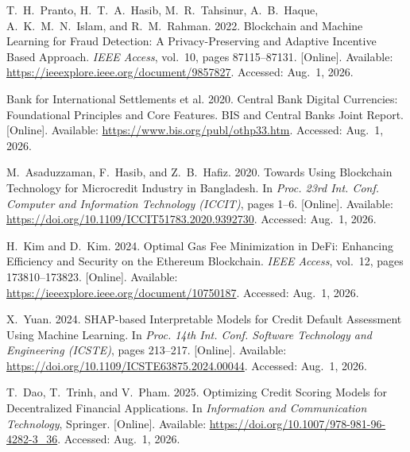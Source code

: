 \documentclass[12pt,a4paper]{report}
\begin{document}
{\begin{enumerate}[label={[\arabic*]}]
\item T.~H.~Pranto, H.~T.~A.~Hasib, M.~R.~Tahsinur, A.~B.~Haque, A.~K.~M.~N.~Islam, and R.~M.~Rahman. 2022. Blockchain and Machine Learning for Fraud Detection: A Privacy-Preserving and Adaptive Incentive Based Approach. \emph{IEEE Access}, vol.~10, pages 87115--87131. [Online]. Available: \url{https://ieeexplore.ieee.org/document/9857827}. Accessed: Aug.~1, 2026.

\item Bank for International Settlements et al. 2020. Central Bank Digital Currencies: Foundational Principles and Core Features. BIS and Central Banks Joint Report. [Online]. Available: \url{https://www.bis.org/publ/othp33.htm}. Accessed: Aug.~1, 2026.

\item M.~Asaduzzaman, F.~Hasib, and Z.~B.~Hafiz. 2020. Towards Using Blockchain Technology for Microcredit Industry in Bangladesh. In \emph{Proc. 23rd Int. Conf. Computer and Information Technology (ICCIT)}, pages 1--6. [Online]. Available: \url{https://doi.org/10.1109/ICCIT51783.2020.9392730}. Accessed: Aug.~1, 2026.

\item H.~Kim and D.~Kim. 2024. Optimal Gas Fee Minimization in DeFi: Enhancing Efficiency and Security on the Ethereum Blockchain. \emph{IEEE Access}, vol.~12, pages 173810--173823. [Online]. Available: \url{https://ieeexplore.ieee.org/document/10750187}. Accessed: Aug.~1, 2026.

\item X.~Yuan. 2024. SHAP-based Interpretable Models for Credit Default Assessment Using Machine Learning. In \emph{Proc. 14th Int. Conf. Software Technology and Engineering (ICSTE)}, pages 213--217. [Online]. Available: \url{https://doi.org/10.1109/ICSTE63875.2024.00044}. Accessed: Aug.~1, 2026.

\item T.~Dao, T.~Trinh, and V.~Pham. 2025. Optimizing Credit Scoring Models for Decentralized Financial Applications. In \emph{Information and Communication Technology}, Springer. [Online]. Available: \url{https://doi.org/10.1007/978-981-96-4282-3_36}. Accessed: Aug.~1, 2026.




\end{enumerate}}
\end{document}
